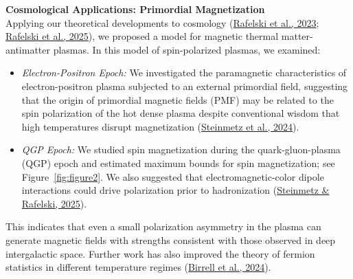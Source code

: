 \documentclass[11pt]{article}
\begin{document}
\vspace{1em}

{\noindent\Large\textbf{Cosmological Applications: Primordial Magnetization}}\\
Applying our theoretical developments to cosmology (\href{https://doi.org/10.3390/universe9070309}{Rafelski et al., 2023}; \href{https://doi.org/10.48550/arXiv.2409.19031}{Rafelski et al., 2025}), we proposed a model for magnetic thermal matter-antimatter plasmas. In this model of spin-polarized plasmas, we examined:
\begin{itemize}[leftmargin=1.5em,nosep]
    \item \emph{Electron-Positron Epoch:} We investigated the paramagnetic characteristics of electron-positron plasma subjected to an external primordial field, suggesting that the origin of primordial magnetic fields (PMF) may be related to the spin polarization of the hot dense plasma despite conventional wisdom that high temperatures disrupt magnetization (\href{https://doi.org/10.1103/PhysRevD.108.123522}{Steinmetz et al., 2024}).
    \item \emph{QGP Epoch:} We studied spin magnetization during the quark-gluon-plasma (QGP) epoch and estimated maximum bounds for spin magnetization; see Figure~\ref{fig:figure2}. We also suggested that electromagnetic-color dipole interactions could drive polarization prior to hadronization (\href{https://doi.org/10.48550/arXiv.2502.05052}{Steinmetz \& Rafelski, 2025}).
\end{itemize}
This indicates that even a small polarization asymmetry in the plasma can generate magnetic fields with strengths consistent with those observed in deep intergalactic space. Further work has also improved the theory of fermion statistics in different temperature regimes (\href{https://doi.org/10.1007/s10773-024-05695-8}{Birrell et al., 2024}).

\vspace{1em}
\end{document}
